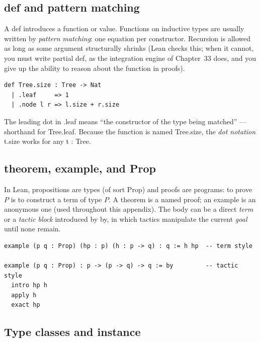 \documentclass[12pt, openany]{book}
\theoremstyle{plain}
\theoremstyle{definition}
\theoremstyle{remark}
\newcommand{\li}[1]{{\ttfamily\small\color{tealaccent}#1}}
\begin{document}
\subsection*{\li{def} and pattern matching}

A \li{def} introduces a function or value.  Functions on inductive types are usually written by \emph{pattern matching}: one equation per constructor.  Recursion is allowed as long as some argument structurally shrinks (Lean checks this; when it cannot, you must write \li{partial def}, as the integration engine of Chapter~33 does, and you give up the ability to reason about the function in proofs).

\begin{leanbox}
\begin{lstlisting}
def Tree.size : Tree -> Nat
  | .leaf     => 1
  | .node l r => l.size + r.size
\end{lstlisting}
\end{leanbox}
\color{black}

The leading dot in \li{.leaf} means ``the constructor of the type being matched'' --- shorthand for \li{Tree.leaf}.  Because the function is named \li{Tree.size}, the \emph{dot notation} \li{t.size} works for any \li{t : Tree}.

\subsection*{\li{theorem}, \li{example}, and \li{Prop}}

In Lean, propositions are types (of sort \li{Prop}) and proofs are programs: to prove $P$ is to construct a term of type $P$.  A \li{theorem} is a named proof; an \li{example} is an anonymous one (used throughout this appendix).  The body can be a direct \emph{term} or a \emph{tactic block} introduced by \li{by}, in which tactics manipulate the current \emph{goal} until none remain.

\begin{leanbox}
\begin{lstlisting}
example (p q : Prop) (hp : p) (h : p -> q) : q := h hp  -- term style

example (p q : Prop) : p -> (p -> q) -> q := by         -- tactic style
  intro hp h
  apply h
  exact hp
\end{lstlisting}
\end{leanbox}
\color{black}

\subsection*{Type classes and \li{instance}}
\end{document}
